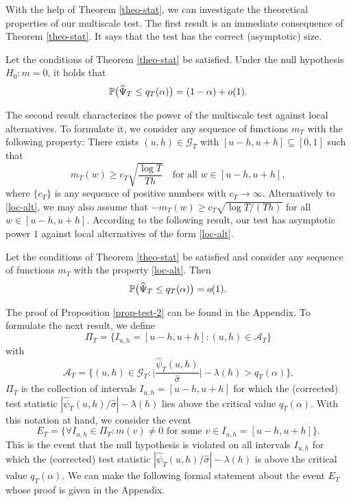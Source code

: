 With the help of Theorem \ref{theo-stat}, we can investigate the theoretical properties of our multiscale test. The first result is an immediate consequence of Theorem \ref{theo-stat}. It says that the test has the correct (asymptotic) size. 
\begin{prop}\label{prop-test-1}
Let the conditions of Theorem \ref{theo-stat} be satisfied. Under the null hypothesis $H_0: m = 0$, it holds that 
\[ \mathbb{P} \big( \widehat{\Psi}_T \le q_T(\alpha) \big) = (1 - \alpha) + o(1). \]
\end{prop}
The second result characterizes the power of the multiscale test against local alternatives. To formulate it, we consider any sequence of functions $m_T$ with the following property: There exists $(u,h) \in \mathcal{G}_T$ with $[u-h,u+h] \subseteq [0,1]$ such that 
\begin{equation}\label{loc-alt}
m_T(w) \ge c_T \sqrt{\frac{\log T}{Th}} \quad \text{for all } w \in [u-h,u+h], 
\end{equation}
where $\{c_T\}$ is any sequence of positive numbers with $c_T \rightarrow \infty$. Alternatively to \eqref{loc-alt}, we may also assume that $-m_T(w) \ge c_T \sqrt{\log T/(Th)}$ for all $w \in [u-h,u+h]$. According to the following result, our test has asymptotic power $1$ against local alternatives of the form \eqref{loc-alt}. 
\begin{prop}\label{prop-test-2}
Let the conditions of Theorem \ref{theo-stat} be satisfied and consider any sequence of functions $m_T$ with the property \eqref{loc-alt}. Then 
\[ \mathbb{P} \big( \widehat{\Psi}_T \le q_T(\alpha) \big) = o(1). \]
\end{prop}
The proof of Proposition \ref{prop-test-2} can be found in the Appendix. To formulate the next result, we define 
\[ \Pi_T = \big\{ I_{u,h} = [u-h,u+h]: (u,h) \in \mathcal{A}_T \big\} \]
with 
\[ \mathcal{A}_T = \Big\{ (u,h) \in \mathcal{G}_T: \Big|\frac{\widehat{\psi}_T(u,h)}{\widehat{\sigma}}\Big| - \lambda(h) > q_T(\alpha) \Big\}. \]
$\Pi_T$ is the collection of intervals $I_{u,h} = [u-h,u+h]$ for which the (corrected) test statistic $|\widehat{\psi}_T(u,h)/\widehat{\sigma}| - \lambda(h)$ lies above the critical value $q_T(\alpha)$. With this notation at hand, we consider the event 
\[ E_T = \Big\{ \forall I_{u,h} \in \Pi_T: m(v) \ne 0 \text{ for some } v \in I_{u,h} = [u-h,u+h] \Big\}. \]
This is the event that the null hypothesis is violated on all intervals $I_{u,h}$ for which the (corrected) test statistic $|\widehat{\psi}_T(u,h)/\widehat{\sigma}| - \lambda(h)$ is above the critical value $q_T(\alpha)$. We can make the following formal statement about the event $E_T$ whose proof is given in the Appendix. 
